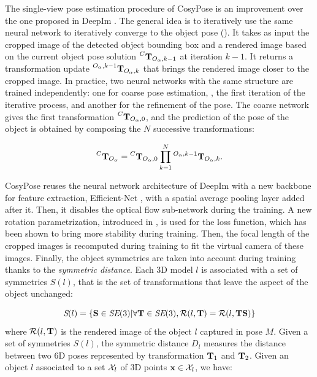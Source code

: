 The single-view pose estimation procedure of CosyPose is an improvement over the one proposed in DeepIm \cite{deepim_2019}. The general idea is to iteratively 
use the same neural network to iteratively converge to the object pose (). It takes as input the cropped image  of the detected 
object bounding box and a rendered image based on the current object pose solution $\prescript{C}{}{{\bf T}}_{O_{\alpha},k-1}$ at iteration $k-1$. 
It returns a transformation update $\prescript{O_{\alpha},k-1}{}{{\bf T}}_{O_{\alpha},k}$ that brings the rendered image closer to the cropped image. In practice, 
two neural networks with the same structure are trained independently: one for coarse pose estimation, \ie, the first iteration of the iterative process, 
and another for the refinement of the pose. The coarse network gives the first transformation $\prescript{C}{}{{\bf T}}_{O_{\alpha},0}$, 
and the prediction of the pose of the object is obtained by composing the $N$ successive transformations:

\begin{equation}
\prescript{C}{}{{\bf T}}_{O_{\alpha}} = \prescript{C}{}{{\bf T}}_{O_{\alpha},0} \prod_{k=1}^N  \prescript{O_{\alpha},k-1}{}{{\bf T}}_{O_{\alpha},k}.
\end{equation}

CosyPose reuses the neural network architecture of DeepIm with a new backbone for feature extraction, Efficient-Net \cite{tan2020efficientnet} ,
with a spatial average pooling layer added after it. Then, it disables the optical flow sub-network during the training. 
A new rotation parametrization, introduced in \cite{zhou2020continuity}, is used for the loss function, which has been shown 
to bring more stability during training. Then, the focal length of the cropped images is recomputed during training to fit the virtual camera 
of these images. Finally, the object symmetries are taken into account during training thanks to the \textit{symmetric distance}. 
Each 3D model $l$ is associated with a set of symmetries $S(l)$, that is the set of transformations that leave the aspect of the object unchanged:

\begin{equation}
    \textit{S}(l) = \left \{ {\bf S} \in \textit{SE}(3) | \forall {\bf T} \in \textit{SE}(3), \mathcal{R}(l,{\bf T}) = \mathcal{R}(l,{\bf T} {\bf S})\right \}
\end{equation}
%
where $\mathcal{R}(l,{\bf T})$ is the rendered image of the object $l$ captured in pose $M$. Given a set of symmetries $S(l)$, 
the symmetric distance $D_l$ measures the distance between two 6D poses represented by transformation ${\bf T}_1$ and ${\bf T}_2$. 
Given an object $l$ associated to a set $\mathcal{X}_l$ of 3D points $\mathbf{x} \in \mathcal{X}_l$, we have:

